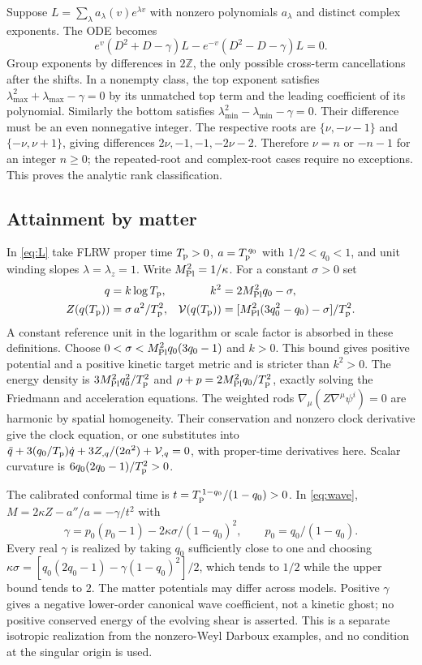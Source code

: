 Suppose \(L=\sum_\lambda a_\lambda(v)e^{\lambda v}\) with nonzero polynomials \(a_\lambda\) and distinct complex exponents. The ODE becomes
\[
 e^v(D^2+D-\gamma)L-e^{-v}(D^2-D-\gamma)L=0 .
\]
Group exponents by differences in \(2\mathbb Z\), the only possible cross-term cancellations after the shifts. In a nonempty class, the top exponent satisfies \(\lambda_{\max}^2+\lambda_{\max}-\gamma=0\) by its unmatched top term and the leading coefficient of its polynomial. Similarly the bottom satisfies \(\lambda_{\min}^2-\lambda_{\min}-\gamma=0\). Their difference must be an even nonnegative integer. The respective roots are \(\{\nu,-\nu-1\}\) and \(\{-\nu,\nu+1\}\), giving differences \(2\nu,-1,-1,-2\nu-2\). Therefore \(\nu=n\) or \(-n-1\) for an integer \(n\ge0\); the repeated-root and complex-root cases require no exceptions. This proves the analytic rank classification.

\subsection{Attainment by matter}
In \eqref{eq:L} take FLRW proper time \(T_{\rm p}>0\), \(a=T_{\rm p}^{\,q_0}\) with \(1/2<q_0<1\), and unit winding slopes \(\lambda=\lambda_z=1\). Write \(M_{\rm Pl}^2=1/\kappa\). For a constant \(\sigma>0\) set
\begin{align*}
 q&=k\log T_{\rm p},& k^2&=2M_{\rm Pl}^2q_0-\sigma,\\
 Z(q(T_{\rm p}))&=\sigma\,a^2/T_{\rm p}^2,&
 \mathcal V(q(T_{\rm p}))&=[M_{\rm Pl}^2(3q_0^2-q_0)-\sigma]/T_{\rm p}^2 .
\end{align*}
A constant reference unit in the logarithm or scale factor is absorbed in these definitions. Choose \(0<\sigma<M_{\rm Pl}^2 q_0(3q_0-1)\) and \(k>0\). This bound gives positive potential and a positive kinetic target metric and is stricter than \(k^2>0\). The energy density is \(3M_{\rm Pl}^2q_0^2/T_{\rm p}^2\) and \(\rho+p=2M_{\rm Pl}^2q_0/T_{\rm p}^2\), exactly solving the Friedmann and acceleration equations. The weighted rods \(\nabla_\mu(Z\nabla^\mu\psi^i)=0\) are harmonic by spatial homogeneity. Their conservation and nonzero clock derivative give the clock equation, or one substitutes into
\(\ddot q+3(q_0/T_{\rm p})\dot q+3Z_{,q}/(2a^2)+\mathcal V_{,q}=0\), with proper-time derivatives here. Scalar curvature is \(6q_0(2q_0-1)/T_{\rm p}^2>0\).

The calibrated conformal time is \(t=T_{\rm p}^{\,1-q_0}/(1-q_0)>0\). In \eqref{eq:wave}, \(M=2\kappa Z-a''/a=-\gamma/t^2\) with
\[
 \gamma=p_0(p_0-1)-2\kappa\sigma/(1-q_0)^2,\qquad p_0=q_0/(1-q_0).
\]
Every real \(\gamma\) is realized by taking \(q_0\) sufficiently close to one and choosing
\(\kappa\sigma=[q_0(2q_0-1)-\gamma(1-q_0)^2]/2\), which tends to \(1/2\) while the upper bound tends to \(2\). The matter potentials may differ across models. Positive \(\gamma\) gives a negative lower-order canonical wave coefficient, not a kinetic ghost; no positive conserved energy of the evolving shear is asserted. This is a separate isotropic realization from the nonzero-Weyl Darboux examples, and no condition at the singular origin is used.

